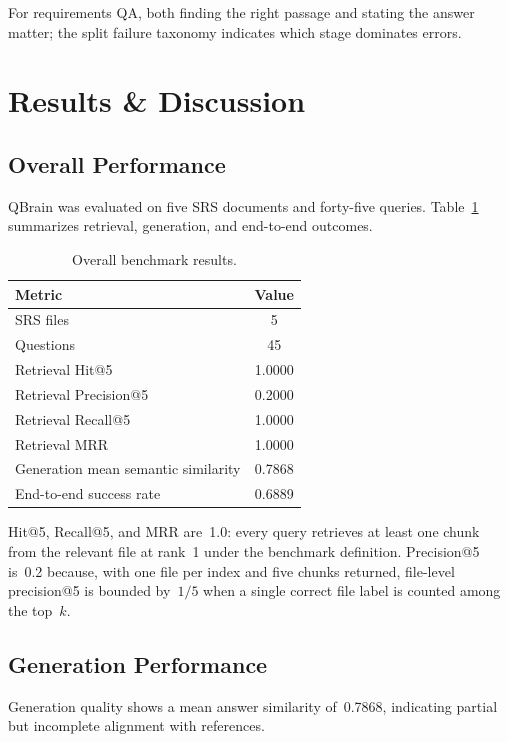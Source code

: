 \documentclass[conference]{IEEEtran}
\begin{document}
For requirements QA, both finding the right passage and stating the answer matter; the split failure taxonomy indicates which stage dominates errors.

\section{Results \& Discussion}
\label{sec:results}

\subsection{Overall Performance}

QBrain was evaluated on five SRS documents and forty-five queries. Table~\ref{tab:overall_results} summarizes retrieval, generation, and end-to-end outcomes.

\begin{table}[h]
\centering
\caption{Overall benchmark results.}
\label{tab:overall_results}
\begin{tabular}{lc}
\hline
Metric & Value \\
\hline
SRS files & 5 \\
Questions & 45 \\
Retrieval Hit@5 & 1.0000 \\
Retrieval Precision@5 & 0.2000 \\
Retrieval Recall@5 & 1.0000 \\
Retrieval MRR & 1.0000 \\
Generation mean semantic similarity & 0.7868 \\
End-to-end success rate & 0.6889 \\
\hline
\end{tabular}
\end{table}

Hit@5, Recall@5, and MRR are~1.0: every query retrieves at least one chunk from the relevant file at rank~1 under the benchmark definition. Precision@5 is~0.2 because, with one file per index and five chunks returned, file-level precision@5 is bounded by~$1/5$ when a single correct file label is counted among the top~$k$.

\subsection{Generation Performance}

Generation quality shows a mean answer similarity of~0.7868, indicating partial but incomplete alignment with references.
\end{document}
